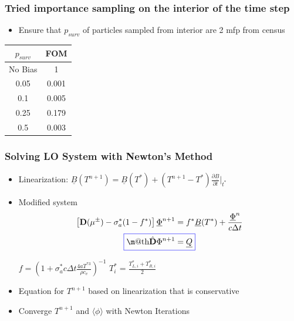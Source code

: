 \documentclass[xcolor=dvipsnames,hyperref={pdfpagelabels=false},unknownkeysallowed]{beamer}
\makeatletter
\newcommand*{\boxedcolor}{blue}
\renewcommand{\boxed}[1]{\textcolor{\boxedcolor}{%
  \fbox{\normalcolor\m@th$\displaystyle#1$}}}
\renewcommand{\u}[1]{\underline{#1}}
\newlength{\wideitemsep}
\let\olditem\item
\renewcommand{\item}{\setlength{\itemsep}{\wideitemsep}\olditem}
\newcommand{\pderiv}[2]{\frac{\partial #1}{\partial #2}}
\newcommand{\B}[1]{\ensuremath{\mathbf{#1}}}
\newcommand{\mom}[1]{\langle #1 \rangle}
\makeatother
\begin{document}
\begin{frame}
    \frametitle{Tried importance sampling on the interior of the time step}
    \begin{itemize}
        \item[] Ensure that $p_{surv}$ of particles sampled from
            interior are 2 mfp from census
    \end{itemize}
\begin{table}[H]
\centering
\vspace{-0.1in}
\begin{tabular}{|cc|} \hline
        $p_{surv}$ & {FOM} \\ \hline
       No Bias & 1 \\ 
       0.05    & 0.001 \\
       0.1     & 0.005 \\
       0.25    & 0.179  \\
       0.5     & 0.003 \\ \hline
\end{tabular}
\end{table}

\end{frame}

\begin{frame}
    \frametitle{Solving LO System with Newton's Method}
    \begin{block}{}
    \begin{itemize}
        \item Linearization: $\displaystyle \u B(T^{n+1}) = \u B(T^*) + \left(T^{n+1} -
                T^*\right) \pderiv{\u B}{t}\bigg|_{t^*}$
        \vspace{-0.15in}
        \item Modified system
            \begin{gather*}
                \displaystyle \left[\B  D(\mu^\pm) - \sigma_a^*(1-f^*) \right]\underline
                \Phi^{n+1}  = f^* \u B(T^*) + \frac{ \underline \Phi^n}{c\Delta t} \\
                \boxed{\hat{ \B  D }\Phi^{n+1} = \underline Q}
            \end{gather*}
        \vspace{-0.07in}
        \begin{center}
         $\displaystyle f = \left( 1 + \sigma_a^*c \Delta t \frac{4aT^{*3}}{\rho
            c_v} \right)^{-1}$  \hspace{0.3in}
         $\displaystyle T_i^* = \frac{T^{*}_{L,i}+T^{*}_{R,i}}{2}$
     \end{center}
 \item Equation for $T^{n+1}$ based on linearization that is conservative
 \item Converge $T^{n+1}$ and $\mom{\phi}$ with Newton Iterations
 \end{itemize}
 \end{block}
\end{frame}
\end{document}
